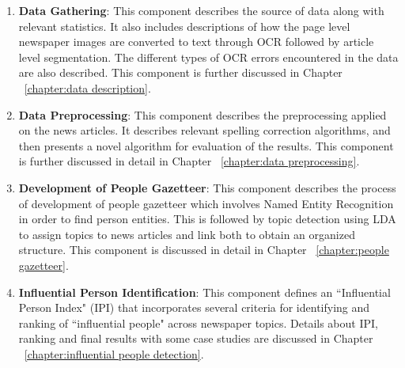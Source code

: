 \begin{enumerate}
\item \textbf {Data Gathering}:  
This component describes the source of data along with relevant statistics. It also includes descriptions of how the page level newspaper images are converted to text through OCR followed by article level segmentation. The different types of OCR errors encountered in the data are also described. This component is further discussed in Chapter ~\ref{chapter:data description}.

\item \textbf {Data Preprocessing}:
This component describes the preprocessing applied on the news articles. It describes relevant spelling correction algorithms, and then presents a novel algorithm for evaluation of the results. This component is further discussed in detail in Chapter ~\ref{chapter:data preprocessing}.

\item \textbf {Development of People Gazetteer}:
This component describes the process of development of people gazetteer which involves Named Entity Recognition in order to find person entities. This is followed by topic detection using LDA to assign topics to news articles and link both to obtain an organized structure. This component is discussed in detail in Chapter ~\ref{chapter:people gazetteer}.

\item \textbf {Influential Person Identification}:
This component defines an ``Influential Person Index" (IPI) that incorporates several criteria for identifying and ranking of ``influential people" across newspaper topics. Details about IPI, ranking and final results with some case studies are discussed in Chapter ~\ref{chapter:influential people detection}.

\end{enumerate}
 




